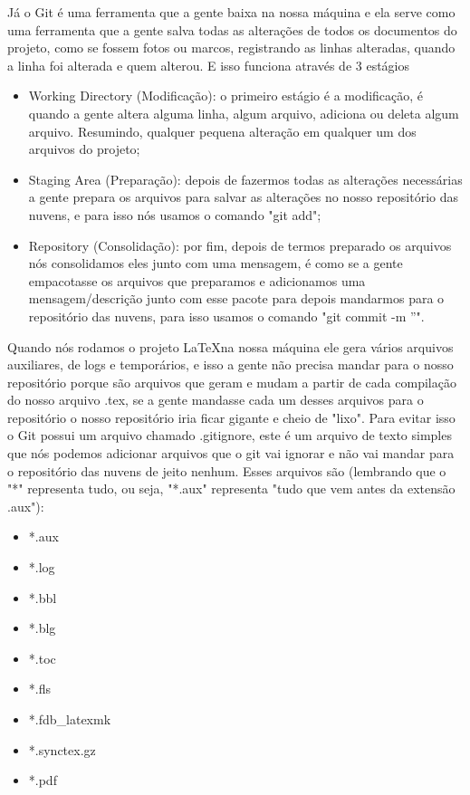 Já o Git é uma ferramenta que a gente baixa na nossa máquina e ela serve como uma ferramenta que a gente salva todas as alterações de todos os documentos do projeto, como se fossem fotos ou marcos, registrando as linhas alteradas, quando a linha foi alterada e quem alterou. E isso funciona através de 3 estágios

\begin{itemize}
    \item Working Directory (Modificação): o primeiro estágio é a modificação, é quando a gente altera alguma linha, algum arquivo, adiciona ou deleta algum arquivo. Resumindo, qualquer pequena alteração em qualquer um dos arquivos do projeto;
    \item Staging Area (Preparação): depois de fazermos todas as alterações necessárias a gente prepara os arquivos para salvar as alterações no nosso repositório das nuvens, e para isso nós usamos o comando "git add";
    \item Repository (Consolidação): por fim, depois de termos preparado os arquivos nós consolidamos eles junto com uma mensagem, é como se a gente empacotasse os arquivos que preparamos e adicionamos uma mensagem/descrição junto com esse pacote para depois mandarmos para o repositório das nuvens, para isso usamos o comando "git commit -m ''". 
\end{itemize}

Quando nós rodamos o projeto \LaTeX na nossa máquina ele gera vários arquivos auxiliares, de logs e temporários, e isso a gente não precisa mandar para o nosso repositório porque são arquivos que geram e mudam a partir de cada compilação do nosso arquivo .tex, se a gente mandasse cada um desses arquivos para o repositório o nosso repositório iria ficar gigante e cheio de "lixo". Para evitar isso o Git possui um arquivo chamado .gitignore, este é um arquivo de texto simples que nós podemos adicionar arquivos que o git vai ignorar e não vai mandar para o repositório das nuvens de jeito nenhum. Esses arquivos são (lembrando que o "*" representa tudo, ou seja, "*.aux" representa "tudo que vem antes da extensão .aux"):

\begin{itemize}
    \item *.aux
    \item *.log
    \item *.bbl
    \item *.blg
    \item *.toc
    \item *.fls
    \item *.fdb\_latexmk
    \item *.synctex.gz
    \item *.pdf
\end{itemize}

